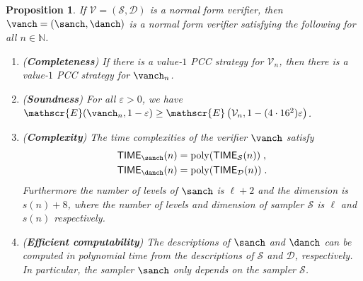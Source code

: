 \documentclass[11pt]{article}
\newtheorem{proposition}[theorem]{Proposition}
\theoremstyle{definition}
\newcommand{\N}{\ensuremath{\mathbb{N}}}
\DeclareMathOperator{\poly}{poly}
\newcommand{\eps}{\varepsilon}
\newcommand{\sampler}{\mathcal{S}}
\newcommand{\decider}{\mathcal{D}}
\newcommand{\verifier}{\mathcal{V}}
\newcommand{\Ent}{\mathscr{E}}
\newcommand{\TIME}{\mathsf{TIME}}
\begin{document}
\begin{proposition}
  \label{prop:anchoring}
  If $\verifier = (\sampler, \decider)$ is a normal form verifier, then 
$\vanch = (\sanch,\danch)$ is a normal form verifier satisfying the following
   for all $n \in \N$.  
\begin{enumerate}
  \item \label{enu:anch-completeness} (\textbf{Completeness}) If there is a
    value-$1$ PCC strategy for $\verifier_n$, then there is a value-$1$ PCC
    strategy for $\vanch_n$.
  \item \label{enu:anch-soundness} (\textbf{Soundness}) For all $\eps > 0$, we have $\Ent(\vanch_n,1 - \eps) \geq \Ent \left (\verifier_n, 1 - (4
        \cdot 16^2) \eps \right)$.
\item \label{enu:anch-complexity} (\textbf{Complexity}) The
    time complexities of the verifier $\vanch$ satisfy
    \begin{align*}
      \TIME_{\sanch}(n) & = \poly(\TIME_\sampler(n))\;,\\
      \TIME_{\danch}(n) & = \poly(\TIME_\decider(n))\;.
    \end{align*}
    Furthermore the number of levels of $\sanch$ is $\ell + 2$ and the dimension is $s(n)+8$, where the number of levels and dimension of sampler $\sampler$ is $\ell$ and $s(n)$ respectively.
  \item \label{enu:anch-efficient-computability} (\textbf{Efficient
      computability}) The descriptions of $\sanch$ and $\danch$
    can be computed in polynomial time from the descriptions of $\sampler$ and
    $\decider$, respectively.
    In particular, the sampler $\sanch$ only depends on the sampler
    $\sampler$.
  \end{enumerate}
\end{proposition}
\end{document}
